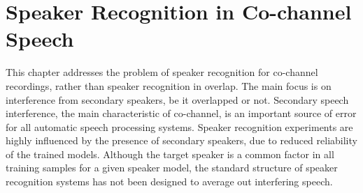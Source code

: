 
\chapter{Speaker Recognition in Co-channel Speech}
\label{chapter:backend}


This chapter addresses the problem of speaker recognition for co-channel recordings, rather than speaker recognition in overlap. 
The main focus is on interference from secondary speakers, be it overlapped or not. 
Secondary speech interference, the main characteristic of co-channel, is an important source of error for all automatic speech processing systems. Speaker recognition experiments are highly influenced by the presence of secondary speakers, due to reduced reliability of the trained models. 
Although the target speaker is a common factor in all training samples for a given speaker model, the standard structure of speaker recognition systems has not been designed to average out interfering speech. 

